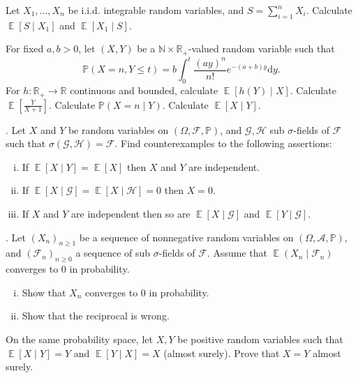 \documentclass[11pt,reqno]{amsart}
\DeclareMathOperator{\E}{\mathbb{E}}      %
\newcommand{\1}{\mathds{1}}
\newcommand{\rd}{{\mathrm{d}}}            %
\theoremstyle{definition}
\theoremstyle{remark}
\numberwithin{equation}{section}
\begin{document}
Let $X_1,\dots,X_n$ be i.i.d. integrable random variables, and $S=\sum_{i=1}^n X_i$. Calculate $\E[S\mid X_1]$ and $\E[X_1\mid S]$.\\

\vspace{0.2cm}

For fixed $a,b>0$, let $(X,Y)$ be a $\mathbb{N}\times\mathbb{R}_+$-valued random variable such that
$$
\mathbb{P}(X=n,Y\leq t)=b\int_0^t\frac{(ay)^n}{n!}e^{-(a+b)y}\rd y.
$$
For $h:\mathbb{R}_+\to\mathbb{R}$ continuous and bounded, calculate $\E[h(Y)\mid X]$.  Calculate $\E[\frac{Y}{X+1}]$. 
Calculate $\mathbb{P}(X=n\mid Y)$. Calculate $\E[X\mid Y]$.


\vspace{0.2cm}


.  Let $X$ and $Y$ be random variables on $(\Omega,\mathcal{F},\mathbb{P})$, and $\mathcal{G}, \mathcal{H}$ sub $\sigma$-fields of $\mathcal{F}$ such that $\sigma(\mathcal{G},\mathcal{H})=\mathcal{F}$. Find counterexamples to the following assertions:
\begin{enumerate}[(i)]
\item If $\E[X\mid Y]=\E[X]$ then $X$ and $Y$ are independent.
\item If $\E[X\mid \mathcal{G}]=\E[X\mid \mathcal{H}]=0$ then $X=0$.
\item If $X$ and $Y$ are independent then so are $\E[X\mid\mathcal{G}]$ and $\E[Y\mid\mathcal{G}]$.
\end{enumerate}

\vspace{0.2cm}


. Let  $(X_n)_{n\geq 1}$ be a sequence of nonnegative random variables on $(\Omega,\mathcal{A},\mathbb{P})$, and $(\mathcal{F}_n)_{n\geq 0}$ a sequence of sub $\sigma$-fields of $\mathcal{F}$. Assume that $\E(X_n\mid \mathcal{F}_n)$ converges to $0$ in probability. 

\begin{enumerate}[(i)]
\item Show that $X_n$ converges to $0$ in probability.
\item Show that the reciprocal is wrong.
\end{enumerate}

\vspace{0.2cm}




On the same probability space,  let $X,Y$ be positive random variables such that $\E[X\mid Y]=Y$ and $\E[Y\mid X]=X$ (almost surely).
Prove that $X=Y$ almost surely.
\end{document}
